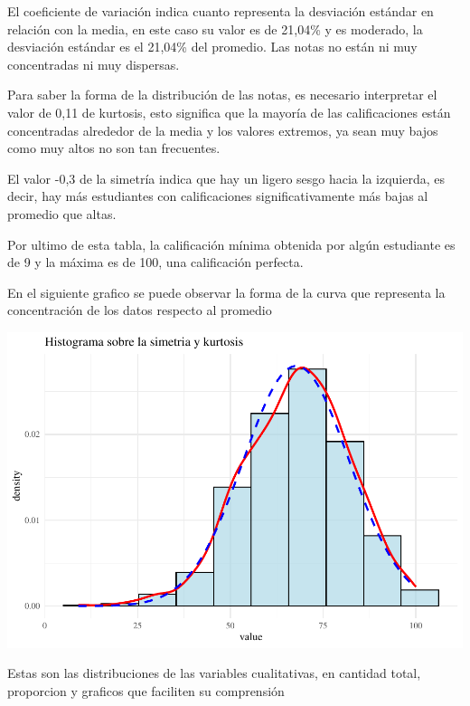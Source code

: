 \documentclass[
]{article}
\begin{document}
El coeficiente de variación indica cuanto representa la desviación
estándar en relación con la media, en este caso su valor es de 21,04\% y
es moderado, la desviación estándar es el 21,04\% del promedio. Las
notas no están ni muy concentradas ni muy dispersas.

Para saber la forma de la distribución de las notas, es necesario
interpretar el valor de 0,11 de kurtosis, esto significa que la mayoría
de las calificaciones están concentradas alrededor de la media y los
valores extremos, ya sean muy bajos como muy altos no son tan
frecuentes.

El valor -0,3 de la simetría indica que hay un ligero sesgo hacia la
izquierda, es decir, hay más estudiantes con calificaciones
significativamente más bajas al promedio que altas.

Por ultimo de esta tabla, la calificación mínima obtenida por algún
estudiante es de 9 y la máxima es de 100, una calificación perfecta.

En el siguiente grafico se puede observar la forma de la curva que
representa la concentración de los datos respecto al promedio

\begin{center}\includegraphics{Trabajo-Grupo-6.-Students-performance_files/figure-latex/unnamed-chunk-2-1} \end{center}

Estas son las distribuciones de las variables cualitativas, en cantidad
total, proporcion y graficos que faciliten su comprensión
\end{document}
